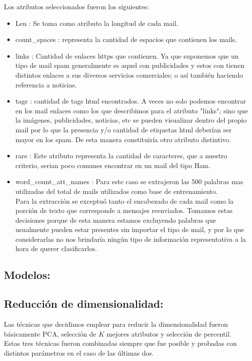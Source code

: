 \documentclass[a4paper]{article}
\begin{document}
Los atributos seleccionados fueron los siguientes:
\begin{itemize}
\item Len : Se toma como atributo la longitud de cada mail.
\item count\_spaces : representa la cantidad de espacios que contienen los mails.
\item links : Cantidad de enlaces https que contienen. Ya que suponemos que un tipo de mail spam generalmente es aquel con publicidades y estos con tienen distintos enlaces a sus diversos servicios comerciales; o así también haciendo referencia a  noticias.
\item tags : cantidad de tags html encontrados. A veces no solo podemos encontrar en los mail enlaces como los que describimos para el atributo "links"; sino que la imágenes, publicidades, noticias, etc se pueden visualizar dentro del propio mail por lo que la presencia y/o cantidad de etiquetas html deberían ser mayor en los spam. De esta manera constituiría otro atributo distintivo. 
\item rare : Este atributo representa la cantidad de caracteres, que a nuestro criterio, serian poco comunes encontrar en un mail del tipo Ham.
\item word\_count\_att\_names : Para este caso se extrajeron las 500 palabras mas utilizadas del total de mails utilizados como base de entrenamiento. \\
Para la extracción se exceptuó tanto el encabezado de cada mail como la porción de texto que corresponde a mensajes reenviados. Tomamos estas decisiones porque de esta manera estamos excluyendo palabras que usualmente pueden estar presentes sin importar el tipo de mail, y por lo que considerarlas no nos brindaría ningún tipo de información representativa a la hora de querer clasificarlos.   
  

\end{itemize}



\subsection{Modelos:}





\subsection{Reducción de dimensionalidad:}
Las técnicas que decidimos emplear para reducir la dimensionalidad fueron básicamente PCA, selección de $K$ mejores atributos y selección de percentil. Estas tres técnicas fueron combinadas siempre que fue posible y probadas con distintos parámetros en el caso de las últimas dos.
\end{document}
